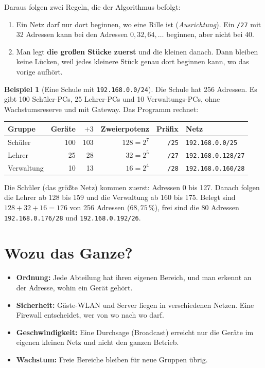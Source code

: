 \documentclass[a4paper,12pt, twoside]{report}
\theoremstyle{definition}
\newtheorem{beispiel}{Beispiel}
\begin{document}
Daraus folgen zwei Regeln, die der Algorithmus befolgt:
\begin{enumerate}
	\item Ein Netz darf nur dort beginnen, wo eine \glqq Rille\grqq{} ist (\emph{Ausrichtung}). Ein \texttt{/27} mit 32 Adressen kann bei den Adressen $0, 32, 64, \dots$ beginnen, aber nicht bei 40.
	\item Man legt \textbf{die großen Stücke zuerst} und die kleinen danach. Dann bleiben keine Lücken, weil jedes kleinere Stück genau dort beginnen kann, wo das vorige aufhört.
\end{enumerate}

\begin{beispiel}[Eine Schule mit \texttt{192.168.0.0/24}]
	Die Schule hat 256 Adressen. Es gibt 100 Schüler-PCs, 25 Lehrer-PCs und 10 Verwaltungs-PCs, ohne Wachstumsreserve und mit Gateway. Das Programm rechnet:
	\begin{center}
	\begin{tabular}{lrrrrl}
	\toprule
	Gruppe & Geräte & $+3$ & Zweierpotenz & Präfix & Netz \\
	\midrule
	Schüler & 100 & 103 & $128 = 2^7$ & \texttt{/25} & \texttt{192.168.0.0/25} \\
	Lehrer & 25 & 28 & $32 = 2^5$ & \texttt{/27} & \texttt{192.168.0.128/27} \\
	Verwaltung & 10 & 13 & $16 = 2^4$ & \texttt{/28} & \texttt{192.168.0.160/28} \\
	\bottomrule
	\end{tabular}
	\end{center}
	Die Schüler (das größte Netz) kommen zuerst: Adressen 0 bis 127. Danach folgen die Lehrer ab 128 bis 159 und die Verwaltung ab 160 bis 175. Belegt sind $128 + 32 + 16 = 176$ von 256 Adressen ($68{,}75\,\%$), frei sind die 80 Adressen \texttt{192.168.0.176/28} und \texttt{192.168.0.192/26}.
\end{beispiel}

\section{Wozu das Ganze?}

\begin{itemize}
	\item \textbf{Ordnung:} Jede Abteilung hat ihren eigenen Bereich, und man erkennt an der Adresse, wohin ein Gerät gehört.
	\item \textbf{Sicherheit:} Gäste-WLAN und Server liegen in verschiedenen Netzen. Eine Firewall entscheidet, wer von wo nach wo darf.
	\item \textbf{Geschwindigkeit:} Eine Durchsage (Broadcast) erreicht nur die Geräte im eigenen kleinen Netz und nicht den ganzen Betrieb.
	\item \textbf{Wachstum:} Freie Bereiche bleiben für neue Gruppen übrig.
\end{itemize}
\end{document}
